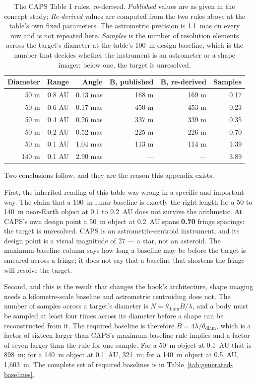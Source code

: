 \begin{table}[!htbp]
\centering
\footnotesize
\caption{The CAPS Table 1 rules, re-derived. \emph{Published} values are as
given in the concept study; \emph{Re-derived} values are computed from the
two rules above at the table's own fixed parameters. The astrometric
precision is 1.1~mas on every row and is not repeated here. \emph{Samples} is the
number of resolution elements across the target's diameter at the table's
100~m design baseline, which is the number that decides whether the
instrument is an astrometer or a shape imager: below one, the target is
unresolved.}
\label{tab:caps-rederivation}
\begin{tabular}{@{}rrrrrr@{}}
\toprule
\rowcolor{panel}
\textbf{Diameter} & \textbf{Range} & \textbf{Angle} & \textbf{B, published} &
\textbf{B, re-derived} & \textbf{Samples} \\
\midrule
50 m & 0.8 AU & 0.13 mas & 168 m & 169 m & 0.17 \\
50 m & 0.6 AU & 0.17 mas & 450 m & 453 m & 0.23 \\
50 m & 0.4 AU & 0.26 mas & 337 m & 339 m & 0.35 \\
50 m & 0.2 AU & 0.52 mas & 225 m & 226 m & 0.70 \\
\rowcolor{panel}
50 m & 0.1 AU & 1.04 mas & 113 m & 114 m & 1.39 \\
140 m & 0.1 AU & 2.90 mas & --- & --- & 3.89 \\
\bottomrule
\end{tabular}
\end{table}

Two conclusions follow, and they are the reason this appendix exists.

First, the inherited reading of this table was wrong in a specific and
important way. The claim that a 100~m lunar baseline is exactly the right
length for a 50 to 140~m near-Earth object at 0.1 to 0.2~AU does not
survive the arithmetic. At CAPS's own design point a 50~m object at
0.2~AU spans \textbf{0.70} fringe spacings: the target is unresolved. CAPS
is an astrometric-centroid instrument, and its design point is a visual
magnitude of 27 --- a star, not an asteroid. The maximum-baseline column
says how long a baseline may be before the target is smeared across a
fringe; it does not say that a baseline that shortens the fringe will
resolve the target.

Second, and this is the result that changes the book's architecture, shape
imaging needs a kilometre-scale baseline and astrometric centroiding does
not. The number of samples across a target's diameter is
\(N = \theta_{\mathrm{diam}} B / \lambda\), and a body must be sampled at
least four times across its diameter before a shape can be reconstructed
from it. The required baseline is therefore \(B = 4\lambda/\theta_{\mathrm{diam}}\),
which is a factor of sixteen larger than CAPS's maximum-baseline rule
implies and a factor of seven larger than the rule for one sample. For a
50~m object at 0.1~AU that is 898~m; for a 140~m object at 0.1~AU, 321~m;
for a 140~m object at 0.5~AU, 1,603~m. The complete set of required
baselines is in Table~\ref{tab:generated-baselines}.

